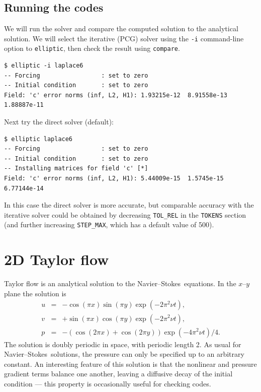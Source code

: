 \documentclass[11pt]{report}
\newcommand\NavSto{Navier--Stokes}
\begin{document}
\subsection{Running the codes}

We will run the solver and compare the computed solution to the
analytical solution.  We will select the iterative (PCG) solver using
the \verb+-i+ command-line option to \texttt{elliptic}, then check the 
result using \texttt{compare}.
{\small
\begin{verbatim}
$ elliptic -i laplace6
-- Forcing                 : set to zero
-- Initial condition       : set to zero
Field: 'c' error norms (inf, L2, H1): 1.93215e-12  8.91558e-13  1.88887e-11
\end{verbatim}
}

Next try the direct solver (default):
{\small
\begin{verbatim}
$ elliptic laplace6
-- Forcing                 : set to zero
-- Initial condition       : set to zero
-- Installing matrices for field 'c' [*]
Field: 'c' error norms (inf, L2, H1): 5.44009e-15  1.5745e-15  6.77144e-14
\end{verbatim}
}
\noindent
In this case the direct solver is more accurate, but comparable
accuracy with the iterative solver could be obtained by decreasing
\verb+TOL_REL+ in the \texttt{TOKENS} section (and further increasing
\verb+STEP_MAX+, which has a default value of 500).

\section{2D Taylor flow}

Taylor flow is an analytical solution to the \NavSto\ equations.
In the $x$--$y$ plane the solution is 
\begin{eqnarray}
        u &=& -\cos(\pi x) \sin(\pi y) \exp(-2\pi^2\nu t),\\
        v &=& +\sin(\pi x) \cos(\pi y) \exp(-2\pi^2\nu t),\\
        p &=& -(\cos(2\pi x) + \cos(2\pi y)) \exp(-4\pi^2\nu t)/4.
\end{eqnarray}
The solution is doubly periodic in space, with periodic length 2.  As
usual for \NavSto\ solutions, the pressure can only be specified
up to an arbitrary constant.  An interesting feature of this solution
is that the nonlinear and pressure gradient terms balance one another,
leaving a diffusive decay of the initial condition --- this property
is occasionally useful for checking codes.
\end{document}
